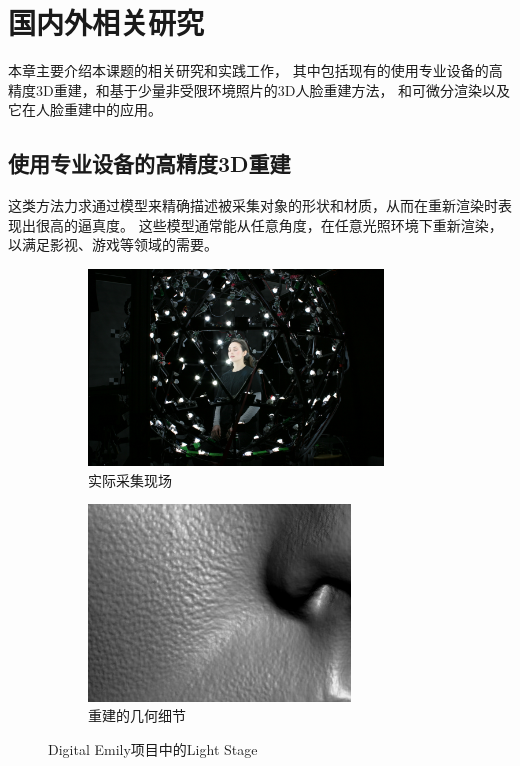 \chapter{国内外相关研究}
\label{chap:related_work}

本章主要介绍本课题的相关研究和实践工作，
其中包括现有的使用专业设备的高精度3D重建，和基于少量非受限环境照片的3D人脸重建方法，
和可微分渲染以及它在人脸重建中的应用。

\section{使用专业设备的高精度3D重建}

这类方法力求通过模型来精确描述被采集对象的形状和材质，从而在重新渲染时表现出很高的逼真度。
这些模型通常能从任意角度，在任意光照环境下重新渲染，以满足影视、游戏等领域的需要。

\begin{figure}[t]
\centering
\begin{subfigure}[b]{0.53\textwidth}
    \centering
    \includegraphics[height=148pt]{figures/light_stage}
    \caption{实际采集现场}
\end{subfigure}%
\begin{subfigure}[b]{0.47\textwidth}
    \centering
    \includegraphics[height=148pt]{figures/emily_detail_1}
    \caption{重建的几何细节}
\end{subfigure}
\caption[Digital Emily 项目中的 Light Stage]{Digital Emily项目中的Light Stage\cite{DEP}}
\end{figure}


